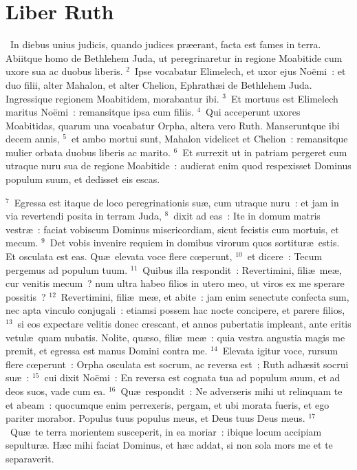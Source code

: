 \clearpage
{\centering \section*{Liber Ruth}}\thispagestyle{empty}

~In diebus unius judicis, quando judices pr\ae erant, facta est fames in terra. Abiitque homo de Bethlehem Juda, ut peregrinaretur in regione Moabitide cum uxore sua ac duobus liberis.
${}^{2}$~Ipse vocabatur Elimelech, et uxor ejus No\"emi~: et duo filii, alter Mahalon, et alter Chelion, Ephrath\ae i de Bethlehem Juda. Ingressique regionem Moabitidem, morabantur ibi.
${}^{3}$~Et mortuus est Elimelech maritus No\"emi~: remansitque ipsa cum filiis.
${}^{4}$~Qui acceperunt uxores Moabitidas, quarum una vocabatur Orpha, altera vero Ruth. Manseruntque ibi decem annis,
${}^{5}$~et ambo mortui sunt, Mahalon videlicet et Chelion~: remansitque mulier orbata duobus liberis ac marito.
${}^{6}$~Et surrexit ut in patriam pergeret cum utraque nuru sua de regione Moabitide~: audierat enim quod respexisset Dominus populum suum, et dedisset eis escas.


${}^{7}$~Egressa est itaque de loco peregrinationis su\ae , cum utraque nuru~: et jam in via revertendi posita in terram Juda,
${}^{8}$~dixit ad eas~: Ite in domum matris vestr\ae~: faciat vobiscum Dominus misericordiam, sicut fecistis cum mortuis, et mecum.
${}^{9}$~Det vobis invenire requiem in domibus virorum quos sortitur\ae\ estis. Et osculata est eas. Qu\ae\ elevata voce flere cœperunt,
${}^{10}$~et dicere~: Tecum pergemus ad populum tuum.
${}^{11}$~Quibus illa respondit~: Revertimini, fili\ae\ me\ae , cur venitis mecum~? num ultra habeo filios in utero meo, ut viros ex me sperare possitis~?
${}^{12}$~Revertimini, fili\ae\ me\ae , et abite~: jam enim senectute confecta sum, nec apta vinculo conjugali~: etiamsi possem hac nocte concipere, et parere filios,
${}^{13}$~si eos expectare velitis donec crescant, et annos pubertatis impleant, ante eritis vetul\ae\ quam nubatis. Nolite, qu\ae so, fili\ae\ me\ae~: quia vestra angustia magis me premit, et egressa est manus Domini contra me.
${}^{14}$~Elevata igitur voce, rursum flere cœperunt~: Orpha osculata est socrum, ac reversa est~; Ruth adh\ae sit socrui su\ae~:
${}^{15}$~cui dixit No\"emi~: En reversa est cognata tua ad populum suum, et ad deos suos, vade cum ea.
${}^{16}$~Qu\ae\ respondit~: Ne adverseris mihi ut relinquam te et abeam~: quocumque enim perrexeris, pergam, et ubi morata fueris, et ego pariter morabor. Populus tuus populus meus, et Deus tuus Deus meus.
${}^{17}$~Qu\ae\ te terra morientem susceperit, in ea moriar~: ibique locum accipiam sepultur\ae . H\ae c mihi faciat Dominus, et h\ae c addat, si non sola mors me et te separaverit.


